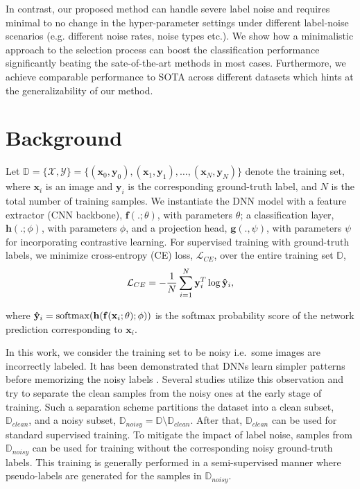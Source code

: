 \documentclass[10pt,twocolumn,letterpaper]{article}
\begin{document}
In contrast, our proposed method can handle severe label noise and requires minimal to no change in the hyper-parameter settings under different label-noise scenarios (e.g. different noise rates, noise types etc.). We show how a minimalistic approach to the selection process can boost the classification performance significantly beating the sate-of-the-art methods in most cases. Furthermore, we achieve comparable performance to SOTA across different datasets which hints at the generalizability of our method. 

\section{Background} \label{sec:Method}
Let $ \mathbb{D} = \{\mathcal{X},\mathcal{Y}\}= {\{(\mathbf{x}_0, \mathbf{y}_0),(\mathbf{x}_1, \mathbf{y}_1), \ldots,
(\mathbf{x}_N , \mathbf{y}_N )\}}$ denote the training set, where $\mathbf{x}_i$
is an image and $\mathbf{y}_i$ is the corresponding ground-truth label,  
and $N$ is the total number of training samples. We instantiate the DNN model with a feature extractor (CNN backbone), $\mathbf{f}(.;\theta)$, with parameters $\theta$; a classification layer, $\mathbf{h}(.;\phi)$, with parameters $\phi$, and a projection head, $\mathbf{g}(.,\psi)$, with parameters $\psi$ for incorporating contrastive learning.
For supervised training with ground-truth labels, we minimize cross-entropy (CE) loss, $\mathcal{L}_{CE}$, over the entire training set $\mathbb{D}$,
\begin{equation}
    \vspace{-0.01cm}
    \mathcal{L}_{CE} = - \frac{1}{N}\sum_{i=1}^{N}{\mathbf{y}_i^T \log\mathbf{\Hat{y}}_i}, 
    \vspace{-1mm}
\end{equation}

\noindent where $\mathbf{\Hat{y}}_i= \mathrm{softmax}(\mathbf{h}(\mathbf{f}(\mathbf{x}_i;\theta);\phi))$ is the softmax probability score of the network prediction corresponding to $\mathbf{x}_i$.


In this work, we consider the training set to be noisy i.e.~some images are incorrectly labeled. 
It has been demonstrated that DNNs learn simpler patterns before memorizing the noisy labels \cite{arpit2017closer}. Several studies \cite{li2020dividemix, han2018co} utilize this observation and try to separate the clean samples from the noisy ones at the early stage of training. Such a separation scheme partitions the dataset into a clean subset, $\mathbb{D}_{clean}$, and a noisy subset, $\mathbb{D}_{noisy} = \mathbb{D} \setminus \mathbb{D}_{clean}$.
After that, $\mathbb{D}_{clean}$ can be used for standard supervised training. To mitigate the impact of label noise, samples from $\mathbb{D}_{noisy}$ can be used for training without the corresponding noisy ground-truth labels. This training is generally performed in a semi-supervised manner where pseudo-labels are generated for the samples in $\mathbb{D}_{noisy}$.
\end{document}

